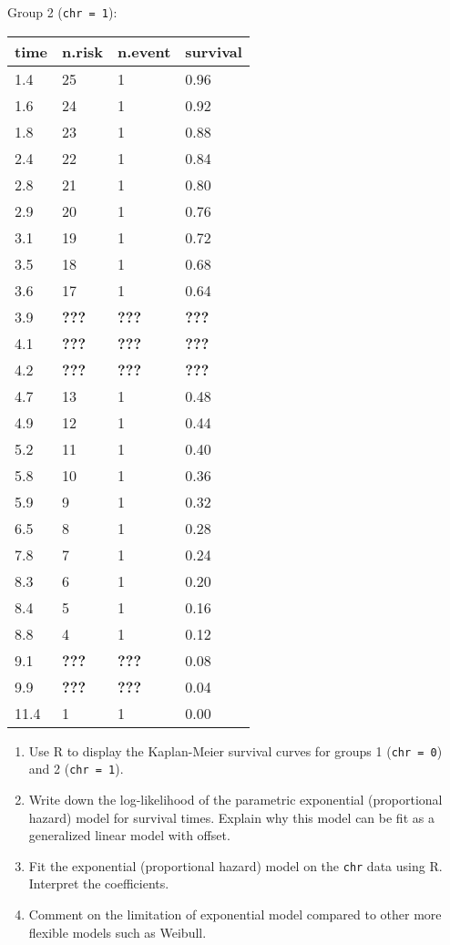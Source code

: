 \documentclass[
]{article}
\begin{document}
Group 2 (\texttt{chr\ =\ 1}):

\begin{longtable}[]{@{}llll@{}}
\toprule()
time & n.risk & n.event & survival \\
\midrule()
\endhead
1.4 & 25 & 1 & 0.96 \\
1.6 & 24 & 1 & 0.92 \\
1.8 & 23 & 1 & 0.88 \\
2.4 & 22 & 1 & 0.84 \\
2.8 & 21 & 1 & 0.80 \\
2.9 & 20 & 1 & 0.76 \\
3.1 & 19 & 1 & 0.72 \\
3.5 & 18 & 1 & 0.68 \\
3.6 & 17 & 1 & 0.64 \\
3.9 & \textbf{???} & \textbf{???} & \textbf{???} \\
4.1 & \textbf{???} & \textbf{???} & \textbf{???} \\
4.2 & \textbf{???} & \textbf{???} & \textbf{???} \\
4.7 & 13 & 1 & 0.48 \\
4.9 & 12 & 1 & 0.44 \\
5.2 & 11 & 1 & 0.40 \\
5.8 & 10 & 1 & 0.36 \\
5.9 & 9 & 1 & 0.32 \\
6.5 & 8 & 1 & 0.28 \\
7.8 & 7 & 1 & 0.24 \\
8.3 & 6 & 1 & 0.20 \\
8.4 & 5 & 1 & 0.16 \\
8.8 & 4 & 1 & 0.12 \\
9.1 & \textbf{???} & \textbf{???} & 0.08 \\
9.9 & \textbf{???} & \textbf{???} & 0.04 \\
11.4 & 1 & 1 & 0.00 \\
\bottomrule()
\end{longtable}

\begin{enumerate}
\def\labelenumi{\arabic{enumi}.}
\setcounter{enumi}{1}
\item
  Use R to display the Kaplan-Meier survival curves for groups 1
  (\texttt{chr\ =\ 0}) and 2 (\texttt{chr\ =\ 1}).
\item
  Write down the log-likelihood of the parametric exponential
  (proportional hazard) model for survival times. Explain why this model
  can be fit as a generalized linear model with offset.
\item
  Fit the exponential (proportional hazard) model on the \texttt{chr}
  data using R. Interpret the coefficients.
\item
  Comment on the limitation of exponential model compared to other more
  flexible models such as Weibull.
\end{enumerate}
\end{document}
